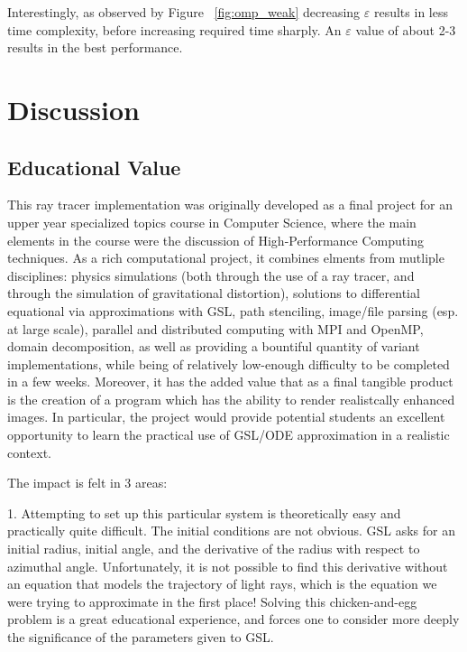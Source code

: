Interestingly, as observed by Figure ~\ref{fig:omp_weak} decreasing $\varepsilon$ results in less time complexity, before increasing required time sharply. An $\varepsilon$ value of about 2-3 results in the best performance.



\section{Discussion}
\label{sec:disc}

\subsection{Educational Value}

This ray tracer implementation was originally developed as a final project for
an upper year specialized topics course in Computer Science, where the main
elements in the course were the discussion of High-Performance Computing
techniques.
As a rich computational project, it combines elments from mutliple disciplines:
physics simulations (both through the use of a ray tracer, and through the simulation of gravitational distortion),
solutions to differential equational via approximations with GSL,
path stenciling, image/file parsing (esp. at large scale),
parallel and distributed computing with MPI and OpenMP, domain decomposition,
as well as providing a bountiful quantity of variant implementations,
while being of relatively low-enough difficulty to be completed in a few weeks.
Moreover, it has the added value that as a final tangible product is the creation of
a program which has the ability to render realistcally enhanced images.
In particular, the project would provide potential students an excellent
opportunity to learn the practical use of GSL/ODE approximation in a realistic
context.

The impact is felt in 3 areas:

1. Attempting to set up this particular system is theoretically easy and practically quite difficult. The initial conditions are not obvious. GSL asks for an initial radius, initial angle, and the derivative of the radius with respect to azimuthal angle. Unfortunately, it is not possible to find this derivative without an equation that models the trajectory of light rays, which is the equation we were trying to approximate in the first place! Solving this chicken-and-egg problem is a great educational experience, and forces one to consider more deeply the significance of the parameters given to GSL. 

